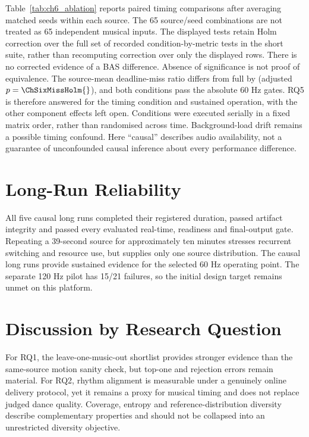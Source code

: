 Table~\ref{tab:ch6_ablation} reports paired timing comparisons after averaging
matched seeds within each source. The 65 source/seed combinations are not
treated as 65 independent musical inputs. The displayed tests retain Holm
correction over the full set of recorded condition-by-metric tests in the
short suite, rather than recomputing correction over only the displayed rows.
There is no corrected evidence of a BAS difference. Absence of significance
is not proof of equivalence. The source-mean deadline-miss ratio differs from
full by \ChSixMissDifference{} (adjusted $p=\ChSixMissHolm{}$), and both
conditions pass the absolute 60 Hz gates. RQ5 is therefore answered for the
timing condition and sustained operation, with the other component effects
left open.
Conditions were executed serially in a fixed matrix order, rather
than randomised across time. Background-load drift remains a possible timing
confound. Here ``causal'' describes audio availability, not a guarantee of
unconfounded causal inference about every performance difference.

\section{Long-Run Reliability}

All five causal long runs completed their registered duration, passed artifact
integrity and passed every evaluated real-time, readiness and final-output gate.
Repeating a 39-second source
for approximately ten minutes stresses recurrent switching and resource use,
but supplies only one source distribution.
The causal long runs provide sustained evidence for the selected 60 Hz operating
point. The separate 120 Hz pilot has 15/21 failures, so the initial design target
remains unmet on this platform.

\section{Discussion by Research Question}

For RQ1, the leave-one-music-out shortlist provides stronger evidence than the
same-source motion sanity check, but top-one and rejection errors remain material.
For RQ2, rhythm alignment is measurable under a genuinely online delivery protocol,
yet it remains a proxy for musical timing and does not replace judged dance quality.
Coverage, entropy and reference-distribution diversity describe complementary
properties and should not be collapsed into an unrestricted diversity objective.

